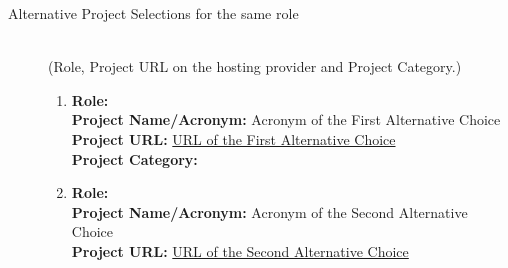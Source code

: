 \documentclass[runningheads]{llncs}
\begin{document}
\begin{description}
  \item[Alternative Project Selections for the same role]\mbox{}\\
    (Role, Project URL on the hosting provider and Project Category.)
    \begin{enumerate}
       \item \textbf{Role:} %
\\
                \textbf{Project Name/Acronym:} Acronym of the First Alternative Choice %
\\
                \textbf{Project URL:} \url{URL of the First Alternative Choice} %
\\
                \textbf{Project Category:} %
       \item \textbf{Role:} %
\\
                \textbf{Project Name/Acronym:} Acronym of the Second Alternative Choice %
\\
                \textbf{Project URL:} \url{URL of the Second Alternative Choice} %

\end{enumerate}
\end{description}
\end{document}
